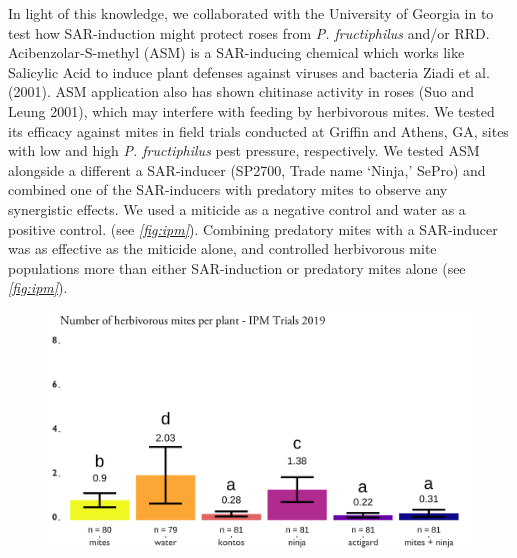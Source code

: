\documentclass[12pt,final,CPage]{ufthesis}
\begin{document}
{  In light of this knowledge, we collaborated with the University of Georgia in to test how SAR-induction might protect roses from \emph{P. fructiphilus} and/or RRD. Acibenzolar-S-methyl (ASM) is a SAR-inducing chemical which works like Salicylic Acid to induce plant defenses against viruses and bacteria Ziadi et al. (2001). ASM application also has shown chitinase activity in roses (Suo and Leung 2001), which may interfere with feeding by herbivorous mites. We tested its efficacy against mites in field trials conducted at Griffin and Athens, GA, sites with low and high \emph{P. fructiphilus} pest pressure, respectively. We tested ASM alongside a different a SAR-inducer (SP2700, Trade name `Ninja,' SePro) and combined one of the SAR-inducers with predatory mites to observe any synergistic effects. We used a miticide as a negative control and water as a positive control. (see \emph{\ref{fig:ipm}}). Combining predatory mites with a SAR-inducer was as effective as the miticide alone, and controlled herbivorous mite populations more than either SAR-induction or predatory mites alone (see \emph{\ref{fig:ipm}}).
  \begin{figure}

  {\centering \includegraphics[width=0.8\linewidth]{figure/ipm_graph} 

  }


\end{figure}}
\end{document}

